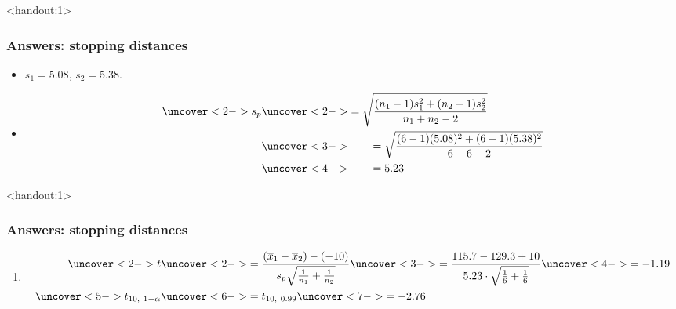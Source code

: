 \documentclass[handout]{beamer}\usepackage[]{graphicx}\usepackage[]{color}
\newcommand{\answers}{1}
\providecommand{\ov}[1]{\overline{#1}}
\numberwithin{equation}{section}
\begin{document}
\begin{frame}<handout:\answers>
\frametitle{Answers: stopping distances}
\begin{itemize}
\item $s_1 = 5.08$, $s_2 = 5.38$.
\item 
\begin{align*}
\uncover<2->{s_p} &\uncover<2->{= \sqrt{\frac{(n_1 - 1)s_1^2 + (n_2 - 1)s_2^2}{n_1 + n_2 - 2}}} \\
 &\uncover<3->{ \qquad = \sqrt{\frac{(6 - 1)(5.08)^2 + (6 - 1)(5.38)^2}{6 + 6 - 2}} }\\
 &\uncover<4->{ \qquad = 5.23}
\end{align*}
\end{itemize}
\end{frame}



\begin{frame}<handout:\answers>
\frametitle{Answers: stopping distances} \small
\begin{enumerate}[1. ]
 \setcounter{enumi}{\value{saveenum}}
\item
\begin{align*}
\uncover<2->{t} & \uncover<2->{=  \frac{(\ov{x}_1 - \ov{x}_2) - (-10)}{s_p \sqrt{\frac{1}{n_1} + \frac{1}{n_2}}}}\uncover<3->{ = \frac{115.7 - 129.3 +10 }{5.23 \cdot \sqrt{\frac{1}{6} + \frac{1}{6}}}} \uncover<4->{ = -1.19 }\\
\uncover<5->{t_{10, \ 1 - \alpha}} & \uncover<6->{= t_{10, \ 0.99}} \uncover<7->{ = -2.76}  \\
\end{align*}
\end{enumerate}
\end{frame}
\end{document}

